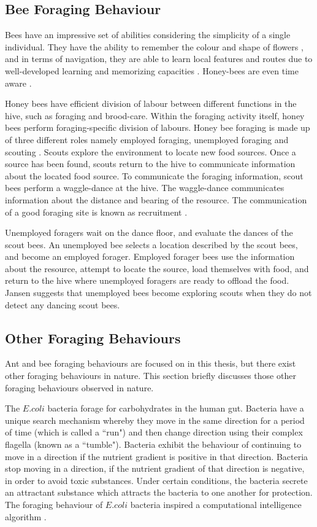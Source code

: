 \subsection{Bee Foraging Behaviour}
\label{bees:biologicalinspiration}
Bees have an impressive set of abilities considering the simplicity of a single individual. They have the ability to remember the colour and shape of flowers \cite{zhang2006honeybee}, and in terms of navigation, they are able to learn local features and routes due to well-developed learning and memorizing capacities \cite{menzel2001cognitive}. Honey-bees are even time aware \cite{moore1989influence}. 

Honey bees have efficient division of labour between different functions in the hive, such as foraging and brood-care. Within the foraging activity itself, honey bees perform foraging-specific division of labours. Honey bee foraging is made up of three different roles namely employed foraging, unemployed foraging and scouting \cite{seeley2009wisdom}. Scouts explore the environment to locate new food sources. Once a source has been found, scouts return to the hive to communicate information about the located food source. To communicate the foraging information, scout bees perform a waggle-dance at the hive. The waggle-dance communicates information about the distance and bearing of the resource. The communication of a good foraging site is known as recruitment \cite{seeley2009wisdom}.

Unemployed foragers wait on the dance floor, and evaluate the dances of the scout bees. An unemployed bee selects a location described by the scout bees, and become an employed forager. Employed forager bees use the information about the resource, attempt to locate the source, load themselves with food, and return to the hive where unemployed foragers are ready to offload the food. Jansen \cite{janson2007searching} suggests that unemployed bees become exploring scouts when they do not detect any dancing scout bees. 


\subsection{Other Foraging Behaviours}
\label{foraging:other}
Ant and bee foraging behaviours are focused on in this thesis, but there exist other foraging behaviours in nature. This section briefly discusses those other foraging behaviours observed in nature.

The $E. coli$ bacteria forage for carbohydrates in the human gut. Bacteria have a unique search mechanism whereby they move in the same direction for a period of time (which is called a ``run") and then change direction using their complex flagella (known as a ``tumble"). Bacteria exhibit the behaviour of continuing to move in a direction if the nutrient gradient is positive in that direction. Bacteria stop moving in a direction, if the nutrient gradient of that direction is negative, in order to avoid toxic substances. Under certain conditions, the bacteria secrete an attractant substance which attracts the bacteria to one another for protection. The foraging behaviour of $E. coli$ bacteria inspired a computational intelligence algorithm \cite{passino2010bacterial}.


